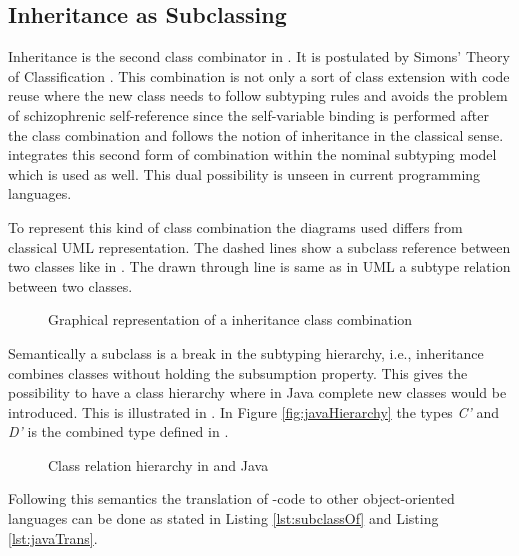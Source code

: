 \subsection{Inheritance as Subclassing}
Inheritance is the second class combinator in \ooplss. It is postulated
by Simons' Theory of Classification \cite{simons_theory_2004-2}.
This combination is not only a sort of class extension with code
reuse where the new class needs to follow subtyping rules and avoids
the problem of schizophrenic self-reference since the self-variable
binding is performed after the class combination and follows the notion
of inheritance in the classical sense. \ooplss integrates this second
form of combination within the nominal subtyping model which is used as
well. This dual possibility is unseen in current programming languages.

To represent this kind of class combination the diagrams used differs from classical
UML representation. The dashed lines show a subclass reference between two classes
like in . The drawn through line is same as in UML
a subtype relation between two classes.

\begin{figure}
	\centering
	\caption{Graphical representation of a inheritance class combination}
	\label{fig:subclassCombination}
\end{figure}

Semantically a subclass is a break in the subtyping hierarchy, i.e., inheritance
combines classes without holding the subsumption property. This gives \ooplss
the possibility to have a class hierarchy where in Java complete new classes
would be introduced. This is illustrated in . In Figure
\ref{fig:javaHierarchy} the types \emph{C'} and \emph{D'} is the combined type
defined in \ooplss.

\begin{figure}
	\centering
	\caption{Class relation hierarchy in \ooplss and Java}
	\label{fig:inheritHierarchy}
\end{figure}

Following this semantics the translation of \ooplss-code to
other object-oriented languages can be done as stated in Listing
\ref{lst:subclassOf} and Listing \ref{lst:javaTrans}.

